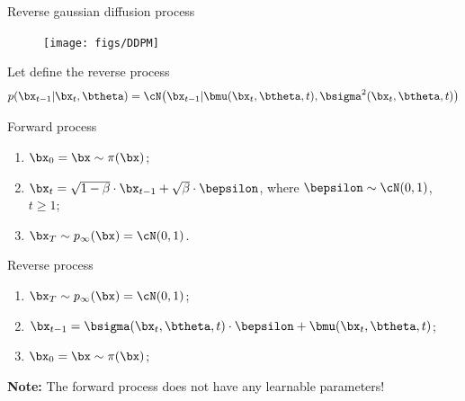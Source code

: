\begin{frame}{Reverse gaussian diffusion process}
	\vspace{-0.3cm} 
	\begin{figure}
		\texttt{[image: figs/DDPM]}
	\end{figure}
	\vspace{-0.3cm} 
	Let define the reverse process
	\vspace{-0.2cm}
	\[
		p(\bx_{t - 1} | \bx_t, \btheta) = \cN \bigl(\bx_{t - 1} | \bmu(\bx_t, \btheta, t), \bsigma^2(\bx_t, \btheta, t)\bigr)
	\]
	\vspace{-0.5cm}
	\begin{minipage}{0.5\linewidth}
		\begin{block}{Forward process}
			\begin{enumerate}
				\item $\bx_0 = \bx \sim \pi(\bx)$;
				\item $\bx_t = \sqrt{1 - \beta} \cdot \bx_{t - 1} + \sqrt{\beta} \cdot \bepsilon$, where $\bepsilon \sim \cN(0, 1)$, $t \geq 1$;
				\item $\bx_T \sim p_{\infty}(\bx) = \cN(0, 1)$.
			\end{enumerate}
		\end{block}
	\end{minipage}%
	\begin{minipage}{0.5\linewidth}
		\begin{block}{Reverse process}
			\begin{enumerate}
				\item $\bx_T \sim p_{\infty}(\bx) = \cN(0, 1)$;
				\item $\bx_{t - 1} = \bsigma(\bx_t, \btheta, t) \cdot \bepsilon + \bmu(\bx_t, \btheta, t)$;
				\item $\bx_0 = \bx \sim \pi(\bx)$;
			\end{enumerate}
		\end{block}
	\end{minipage}
	\textbf{Note:} The forward process does not have any learnable parameters!
\end{frame}
